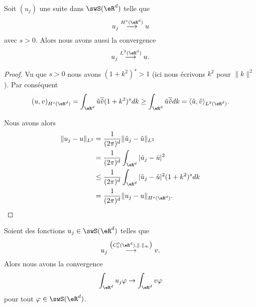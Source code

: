 \begin{lemma}       \label{LEMooZIBIooANHyPy}
    Soit \( (u_j)\) une suite dans \( \swS(\eR^d)\) telle que
    \begin{equation}
        u_j\stackrel{H^s(\eR^d)}{\longrightarrow}u
    \end{equation}
    avec \( s>0\). Alors nous avons aussi la convergence
    \begin{equation}
        u_j\stackrel{L^2(\eR^d)}{\longrightarrow}u.
    \end{equation}
\end{lemma}

\begin{proof}
    Vu que \( s>0\) nous avons \( (1+k^2)^s>1\) (ici nous écrivons \( k^2\) pour \( \| k \|^2\)). Par conséquent
    \begin{equation}
        (u,v)_{H^s(\eR^d)}=\int_{\eR^d}\hat u\overline{ \hat v }(1+k^2)^sdk\geq \int_{\eR^d}\hat u\overline{ \hat v }dk=\langle \hat u, \hat v\rangle_{L^2(\eR^d)}.
    \end{equation}

    Nous avons alors
    \begin{subequations}
        \begin{align}
            \| u_j-u \|_{L^2}&=\frac{1}{ (2\pi)^d }\| \hat u_j-\hat u \|_{L^2}\\
            &=\frac{1}{ (2\pi)^d }\int_{\eR^d}| \hat u_j-\hat u |^2\\
            &\leq \frac{1}{(2\pi)^d}\int_{\eR^d}| \hat u_j-\hat u |^2(1+k^2)^sdk\\
            &=\frac{1}{ (2\pi)^d }\| u_j-u \|_{H^s(\eR^d)}.
        \end{align}
    \end{subequations}
\end{proof}

\begin{lemma}       \label{LEMooGDTXooJRudME}
    Soient des fonctions \(u_j\in\swS(\eR^d) \) telles que
    \begin{equation}
        u_j\stackrel{\big( C_0^0(\eR^d),\| . \|_{\infty} \big)}{\longrightarrow}v.
    \end{equation}
    Alors nous avons la convergence
    \begin{equation}
        \int_{\eR^d}u_j\varphi\to\int_{\eR^d}v\varphi
    \end{equation}
    pour tout \( \varphi\in\swS(\eR^d)\).
\end{lemma}

